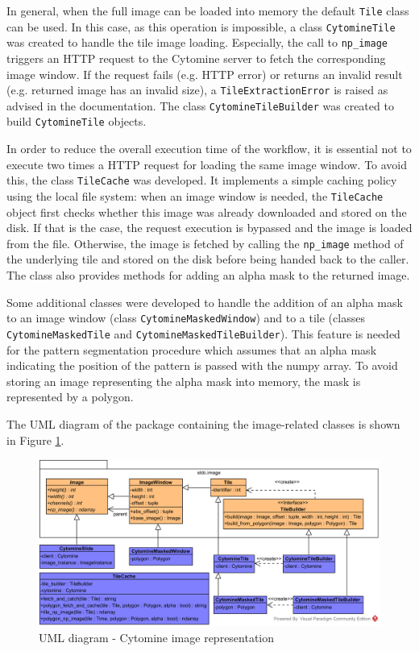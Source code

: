 In general, when the full image can be loaded into memory the default \texttt{Tile} class can be used. In this case, as this operation is impossible, a class \texttt{CytomineTile} was created to handle the tile image loading. Especially, the call to \texttt{np\_image} triggers an HTTP request to the Cytomine server to fetch the corresponding image window. If the request fails (e.g. HTTP error) or returns an invalid result (e.g. returned image has an invalid size), a \texttt{TileExtractionError} is raised as advised in the documentation. The class \texttt{CytomineTileBuilder} was created to build \texttt{CytomineTile} objects.

In order to reduce the overall execution time of the workflow, it is essential not to execute two times a HTTP request for loading the same image window. To avoid this, the class \texttt{TileCache} was developed. It implements a simple caching policy using the local file system: when an image window is needed, the \texttt{TileCache} object first checks whether this image was already downloaded and stored on the disk. If that is the case, the request execution is bypassed and the image is loaded from the file. Otherwise, the image is fetched by calling the \texttt{np\_image} method of the underlying tile and stored on the disk before being handed back to the caller. The class also provides methods for adding an alpha mask to the returned image. 

Some additional classes were developed to handle the addition of an alpha mask to an image window (class \texttt{CytomineMaskedWindow}) and to a tile (classes \texttt{CytomineMaskedTile} and \texttt{CytomineMaskedTileBuilder}). This feature is needed for the pattern segmentation procedure which assumes that an alpha mask indicating the position of the pattern is passed with the numpy array. To avoid storing an image representing the alpha mask into memory, the mask is represented by a polygon. 

The UML diagram of the package containing the image-related classes is shown in Figure \ref{fig:uml_cyto_im_repr}.

\begin{figure}
	\center
	\includegraphics[scale=0.75]{image/thyroid_image.png}
	\caption{UML diagram - Cytomine image representation}
	\label{fig:uml_cyto_im_repr}
\end{figure}

